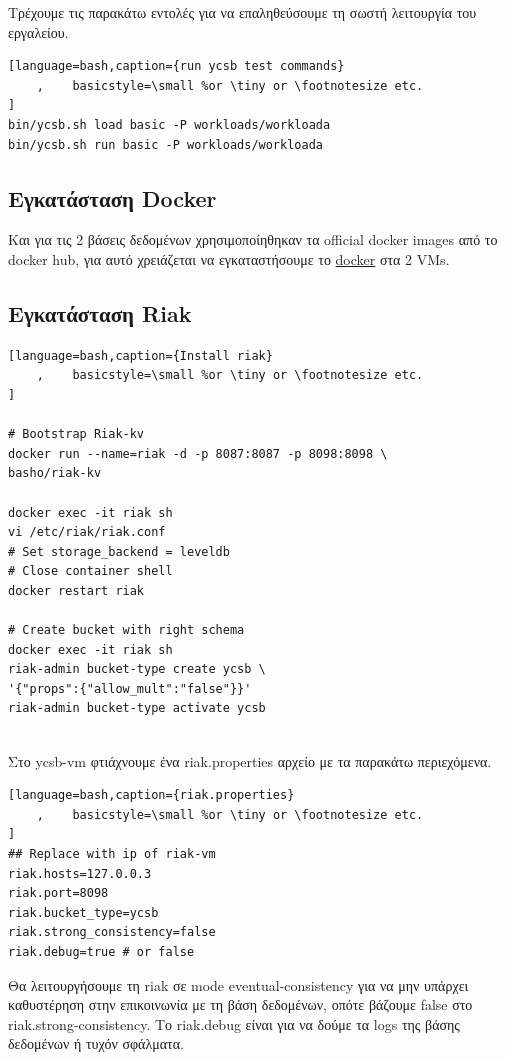\documentclass[conference]{IEEEtran}
\begin{document}
Τρέχουμε τις παρακάτω εντολές για να επαληθεύσουμε τη σωστή λειτουργία του εργαλείου.

\begin{lstlisting}[language=bash,caption={run ycsb test commands}
    ,    basicstyle=\small %or \tiny or \footnotesize etc.
]
bin/ycsb.sh load basic -P workloads/workloada
bin/ycsb.sh run basic -P workloads/workloada

\end{lstlisting}



\subsection{Εγκατάσταση Docker}
Και για τις 2 βάσεις δεδομένων χρησιμοποίηθηκαν τα official docker images από το docker hub, για αυτό χρειάζεται να εγκαταστήσουμε το 
\href{https://docs.docker.com/engine/install/ubuntu/}{docker}
στα 2 VMs. 


\subsection{Εγκατάσταση Riak}

\begin{lstlisting}[language=bash,caption={Install riak}
    ,    basicstyle=\small %or \tiny or \footnotesize etc.
]

# Bootstrap Riak-kv
docker run --name=riak -d -p 8087:8087 -p 8098:8098 \
basho/riak-kv

docker exec -it riak sh
vi /etc/riak/riak.conf
# Set storage_backend = leveldb
# Close container shell
docker restart riak

# Create bucket with right schema
docker exec -it riak sh
riak-admin bucket-type create ycsb \
'{"props":{"allow_mult":"false"}}'
riak-admin bucket-type activate ycsb


\end{lstlisting}
Στο ycsb-vm φτιάχνουμε ένα riak.properties αρχείο με τα παρακάτω περιεχόμενα.
\begin{lstlisting}[language=bash,caption={riak.properties}
    ,    basicstyle=\small %or \tiny or \footnotesize etc.
]
## Replace with ip of riak-vm
riak.hosts=127.0.0.3
riak.port=8098
riak.bucket_type=ycsb
riak.strong_consistency=false
riak.debug=true # or false
\end{lstlisting}
Θα λειτουργήσουμε τη riak σε mode eventual-consistency για να μην υπάρχει 
καθυστέρηση στην επικοινωνία με τη βάση δεδομένων, οπότε βάζουμε false 
στο riak.strong-consistency.
Το riak.debug είναι για να δούμε τα logs της βάσης δεδομένων ή τυχόν σφάλματα.
\end{document}
